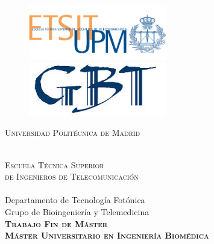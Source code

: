 \begin{titlepage}
\setlength{\headheight}{0pt}
\setlength{\footskip}{0pt}
\setlength{\topmargin}{0pt}

\begin{adjustwidth}{-1cm}{-3cm}

\begin{center}

\begin{figure}[ht]
\begin{minipage}[b]{0.45\linewidth}
\centering
\vfill  
\includegraphics[width=6cm]{images/etsit_small}
\end{minipage}
\hspace{2cm}
\begin{minipage}[b]{0.45\linewidth}
\centering
\vfill  
\includegraphics[width=6cm]{images/gbt}
\end{minipage}
\end{figure}


\vspace*{2cm}

\LARGE
\textsc{Universidad Politécnica de Madrid}

\smallskip
\hfill
\\
\textsc{Escuela Técnica Superior\\ de Ingenieros de Telecomunicación}\\ 
\smallskip
\hfill
\\
Departamento de Tecnología Fotónica\\
Grupo de Bioingeniería y Telemedicina\\

\vspace*{2cm} 
\textsc{\textbf{Trabajo Fin de Máster}}\\
\textsc{\textbf{Máster Universitario en Ingeniería Biomédica}}\\


\end{center}
\end{adjustwidth}
\end{titlepage}
